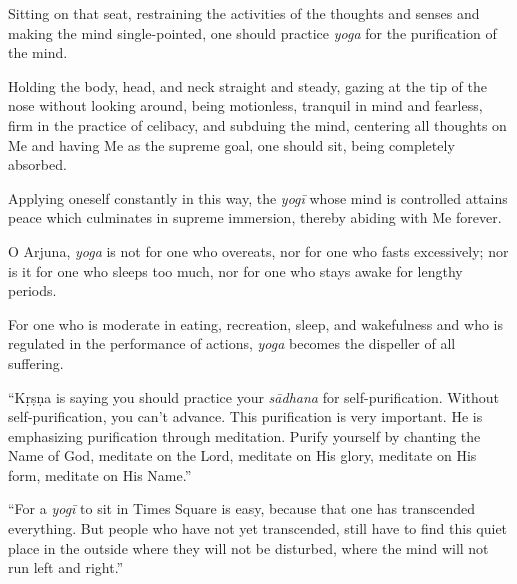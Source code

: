 {Sitting on that seat, restraining the activities of the thoughts and senses and making the mind single-pointed, one should practice \textit{yoga} for the purification of the mind.}

{Holding the body, head, and neck straight and steady, gazing at the tip of the nose without looking around, being motionless, tranquil in mind and fearless, firm in the practice of celibacy, and subduing the mind, centering all thoughts on Me and having Me as the supreme goal, one should sit, being completely absorbed.}

{Applying oneself constantly in this way, the \textit{yogī} whose mind is controlled attains peace which culminates in supreme immersion, thereby abiding with Me forever.}

{O Arjuna, \textit{yoga} is not for one who overeats, nor for one who fasts excessively; nor is it for one who sleeps too much, nor for one who stays awake for lengthy periods.}

{For one who is moderate in eating, recreation, sleep, and wakefulness and who is regulated in the performance of actions, \textit{yoga} becomes the dispeller of all suffering.}


\enquote{Kṛṣṇa is saying you should practice your \textit{sādhana} for self-purification. Without self-purification, you can’t advance. This purification is very important. He is emphasizing purification through meditation. Purify yourself by chanting the Name of God, meditate on the Lord, meditate on His glory, meditate on His form, meditate on His Name.}

\enquote{For a \textit{yogī} to sit in Times Square is easy, because that one has transcended everything. But people who have not yet transcended, still have to find this quiet place in the outside where they will not be disturbed, where the mind will not run left and right.}


